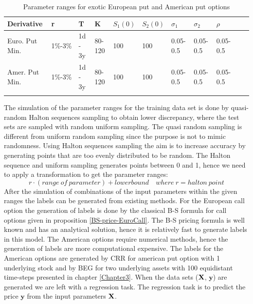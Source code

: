 \begin{table}[th]
\caption[Parameter Ranges For MLPs]{Parameter ranges for exotic European put and American put options}
\label{tab:ExoticParRange}
\centering
\begin{tabular}{l l l l l l l l l l l}
\toprule
\textbf{Derivative} & \textbf{r} & \textbf{T} & K & $S_1(0)$ & $S_2(0)$ & $\sigma_1$ & $\sigma_2$ & $\rho$ \\
\midrule
Euro. Put Min. & 1\%-3\% & 1d - 3y & 80-120 & 100 & 100 & 0.05-0.5 & 0.05-0.5 & 0.05-0.5\\ 
Amer. Put Min. & 1\%-3\% & 1d - 3y & 80-120 & 100 & 100 & 0.05-0.5 & 0.05-0.5 & 0.05-0.5\\
\bottomrule\\
\end{tabular}
\end{table}

The simulation of the parameter ranges for the training data set is done by quasi-random Halton sequences sampling to obtain lower discrepancy, where the test sets are sampled with random uniform sampling. The quasi random sampling is different from uniform random sampling since the purpose is not to mimic randomness. Using Halton sequences sampling the aim is to increase accuracy by generating points that are too evenly distributed to be random. The Halton sequence and uniform sampling generates points between 0 and 1, hence we need to apply a transformation to get the parameter ranges:
$$r \cdot (range \ of \ parameter) + lower bound \quad where \ r=halton \ point$$
After the simulation of combinations of the input parameters within the given ranges the labels can be generated from existing methods. For the European call option the generation of labels is done by the classical B-S formula for call options given in proposition \ref{BS-price-EuroCall}. The B-S pricing formula is well known and has an analytical solution, hence it is relatively fast to generate labels in this model. The American options require numerical methods, hence the generation of labels are more computational expensive. The labels for the American options are generated by CRR for american put option with 1 underlying stock and by BEG for two underlying assets with 100 equidistant time-steps presented in chapter \ref{Chapter3}. When the data sets ($\mathbf{X}$, $\bm{y}$) are generated we are left with a regression task. The regression task is to predict the price $\bm{y}$ from the input parameters $\mathbf{X}$.\\ 

